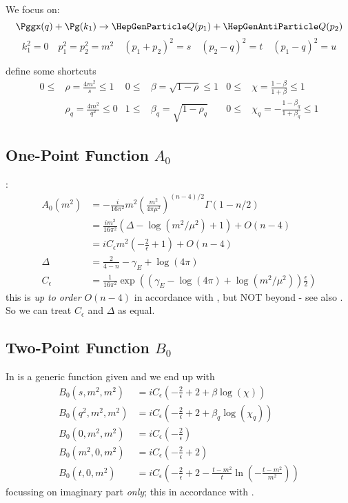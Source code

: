 We focus on:
\begin{equation}
\Pggx(q) + \Pg(k_1) \rightarrow \PQ(p_1)+\PaQ(p_2)
\end{equation}
\begin{equation}
k_1^2 = 0 \quad p_1^2 = p_2^2 = m^2 \quad (p_1+p_2)^2=s\quad (p_2-q)^2=t\quad (p_1-q)^2=u
\end{equation}

define some shortcuts
\begin{align}
0\leq&\rho = \frac {4m^2} s\leq 1 &0\leq&\beta = \sqrt{1-\rho}\leq 1 &0\leq&\chi = \frac{1-\beta}{1+\beta}\leq 1\\
&\rho_q = \frac {4m^2} {q^2}\leq 0 &1\leq&\beta_q = \sqrt{1-\rho_q} &0\leq&\chi_q = -\frac{1-\beta_q}{1+\beta_q}\leq 1
\end{align}

\subsection[One-Point Function A0]{One-Point Function $A_0$}
\cite{Denner:2005nn}:
\begin{align}
A_0(m^2)&=-\frac{i}{16\pi^2}m^2\left(\frac{m^2}{4\pi\mu^2}\right)^{(n-4)/2}\Gamma(1-n/2)\\
 &= \frac{im^2}{16\pi^2}\left(\Delta-\log(m^2/\mu^2)+1\right) + O(n-4)\\
 &= iC_\epsilon m^2 \left(-\frac 2 \epsilon+1\right) + O(n-4)\\
\Delta &= \frac 2 {4-n}-\gamma_E+\log(4\pi)\\
C_\epsilon &= \frac 1 {16\pi^2}\exp\left(\left(\gamma_E-\log(4\pi)+\log\left(m^2/\mu^2\right)\right)\frac{\epsilon} 2\right)
\end{align}
this is \textit{up to order} $O(n-4)$ in accordance with \cite{Bojak:2000eu}\cite{PhysRevD.40.54}, but NOT beyond - see also \cite[eq. (A.12)]{Bojak:2000eu}. So we can treat $C_\epsilon$ and $\Delta$ as equal.

\subsection[Two-Point Function B0]{Two-Point Function $B_0$}
In \cite[eq. (4.23)]{Denner:2005nn} is a generic function given and we end up with
\begin{align}
B_0(s,m^2,m^2) &= iC_\epsilon \left(-\frac 2 \epsilon+2+\beta\log(\chi)\right)\\
B_0(q^2,m^2,m^2) &= iC_\epsilon \left(-\frac 2 \epsilon+2+\beta_q\log(\chi_q)\right)\\
B_0(0,m^2,m^2) &= iC_\epsilon \left(-\frac 2 \epsilon\right)\\
B_0(m^2,0,m^2) &= iC_\epsilon \left(-\frac 2 \epsilon+2\right)\\
B_0(t,0,m^2) &= iC_\epsilon \left(-\frac 2 \epsilon+2-\frac{t-m^2}{t}\ln\left(-\frac{t-m^2}{m^2}\right)\right)
\end{align}
focussing on imaginary part \textit{only}; this in accordance with \cite{Bojak:2000eu}\cite{PhysRevD.40.54}.

